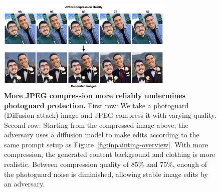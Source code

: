 \begin{figure}[t]
\begin{center}
\includegraphics[width=0.75\textwidth]{images/complex-diffusion-inpaint.002.png}
\end{center}
\caption{\textbf{More JPEG compression more reliably undermines photoguard protection.} First row: We take a photoguard (Diffusion attack) image  and JPEG compress it with varying quality. Second row: Starting from the compressed image above, the adversary uses a diffusion model to make edits according to the same prompt setup as Figure~\ref{fig:inpainting-overview}. With more compression, the generated content background and clothing is more realistic. Between compression quality of 85\% and 75\%, enough of the photoguard  noise is diminished, allowing stable image edits by an adversary.}
\label{figure-jpeg-compression-inpainting}
\end{figure}